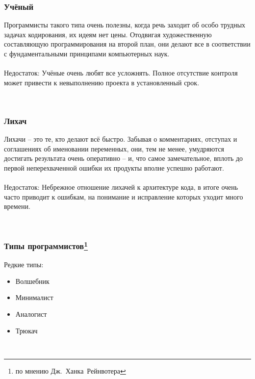 \documentclass{../industrial-development}
\begin{document}
\begin{frame} \frametitle{Учёный}
	Программисты такого типа очень полезны, когда речь заходит об особо трудных задачах кодирования, их идеям нет цены. Отодвигая художественную составляющую программирования на второй план, они делают все в соответствии с фундаментальными принципами компьютерных наук. \\ 
~\\
\alert{Недостаток:}
	 Учёные очень любят все усложнять. Полное отсутствие контроля может привести к невыполнению проекта в установленный срок.
\end{frame}
\lecturenotes
~\cite{How_to_be_a_good_IT-manager}

\begin{frame} \frametitle{Лихач}
	Лихачи – это те, кто делают всё быстро. Забывая о комментариях, отступах и соглашениях об именовании переменных, они, тем не менее, умудряются достигать результата очень оперативно – и, что самое замечательное, вплоть до первой неперехваченной ошибки их продукты вполне успешно работают.  \\ 
~\\
\alert{Недостаток:}
	 Небрежное отношение лихачей к архитектуре кода, в итоге очень часто приводит к ошибкам, на понимание и исправление которых уходит много времени.
\end{frame}
\lecturenotes
~\cite{How_to_be_a_good_IT-manager}

\begin{frame} \frametitle{Типы программистов\footnote[1]{по мнению Дж.~Ханка~Рейнвотера}}
	\begin{block}{Редкие типы:}
\begin{itemize}
\item Волшебник
\item Минималист
\item Аналогист
\item Трюкач
\end{itemize}
\end{block}
\end{frame}
\lecturenotes
~\cite{How_to_be_a_good_IT-manager}
\end{document}
